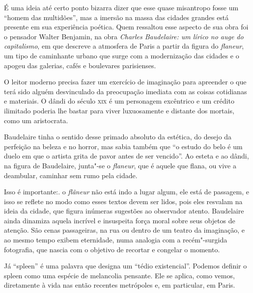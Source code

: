 \documentclass[12pt]{extarticle}
\begin{document}


É uma ideia até certo ponto bizarra dizer que esse quase misantropo
fosse um ``homem das multidões'', mas a imersão na massa das cidades
grandes está presente em sua experiência poética.
Quem ressaltou esse aspecto de sua obra foi o pensador Walter Benjamin,
na obra \textit{Charles Baudelaire: um lírico no auge do capitalismo}, em
que descreve a atmosfera de Paris a partir da figura do \textit{flaneur}, um
tipo de caminhante urbano que surge com a modernização das cidades e o
apogeu das galerias, cafés e boulevares parisienses.




O leitor moderno precisa fazer um exercício de imaginação para apreender
o que terá sido alguém desvinculado da preocupação imediata com as
coisas cotidianas e materiais.
O dândi do século \textsc{xix} é um personagem excêntrico e um crédito
ilimitado poderia lhe bastar para viver luxuosamente e distante dos
mortais, como um aristocrata.

Baudelaire tinha o sentido desse primado absoluto da estética, do
desejo da perfeição na beleza e no horror, mas sabia também que ``o
estudo do belo é um duelo em que o artista grita de pavor antes de ser
vencido''.
Ao esteta e ao dândi, na figura de Baudelaire, junta"-se o \textit{flaneur},
que é aquele que flana, ou vive a deambular, caminhar sem rumo pela
cidade.

Isso é importante:. o \textit{flâneur} não está indo a lugar algum, ele está de
passagem, e isso se reflete no modo como esses textos devem ser lidos,
pois eles resvalam na ideia da cidade, que figura inúmeras sugestões ao observador atento.
Baudelaire ainda dinamiza aquela incrível e insuspeita força moral sobre
seus objetos de atenção.
São cenas passageiras, na rua ou dentro de um teatro da imaginação, e
ao mesmo tempo exibem eternidade, numa analogia com a recém"-surgida
fotografia, que nascia com o objetivo de recortar e congelar o
momento.

Já ``spleen'' é uma palavra que designa um ``tédio existencial''.
Podemos definir o spleen como uma espécie de melancolia pensante.
Ele se aplica, como vemos, diretamente à vida nas então recentes
metrópoles e, em particular, em Paris.
\end{document}
